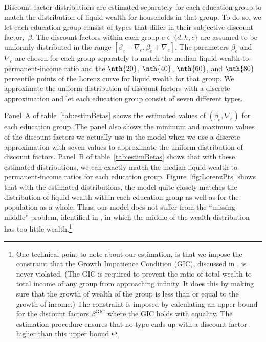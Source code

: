 \documentclass[\econtexRoot/HAFiscal]{subfiles}
\begin{document}
Discount factor distributions are estimated separately for each education group to match the distribution of liquid wealth for households in that group.
To do so, we let each education group consist of types that differ in their subjective discount factor,~$\beta$.
The discount factors within each group $e\in \{d, h, c\}$ are assumed to be uniformly distributed in the range $[\beta_e-\nabla_e, \beta_e+\nabla_e]$.
The parameters $\beta_e$ and $\nabla_e$ are chosen for each group separately to match the median liquid-wealth-to-permanent-income ratio and the $\nth{20}$, $\nth{40}$, $\nth{60}$, and $\nth{80}$ percentile points of the Lorenz curve for liquid wealth for that group.
We approximate the uniform distribution of discount factors with a discrete approximation and let each education group consist of seven different types.

Panel~A of table~\ref{tab:estimBetas} shows the estimated values of $(\beta_e, \nabla_e)$ for each education group.
The panel also shows the minimum and maximum values of the discount factors we actually use in the model when we use a discrete approximation with seven values to approximate the uniform distribution of discount factors.
Panel~B of table~\ref{tab:estimBetas} shows that with these estimated distributions, we can exactly match the median liquid-wealth-to-permanent-income ratios for each education group.
Figure~\ref{fig:LorenzPts} shows that with the estimated distributions, the model quite closely matches the distribution of liquid wealth within each education group as well as for the population as a whole.
Thus, our model does not suffer from the ``missing middle'' problem, identified in \cite{kaplanMPC2022}, in which the middle of the wealth distribution has too little wealth.\footnote{One technical point to note about our estimation, is that we impose the constraint that the Growth Impatience Condition (GIC), discussed in \cite{carroll2022theoretical}, is never violated. (The GIC is required to prevent the ratio of total wealth to total income of any group from approaching infinity. It does this by making sure that the growth of wealth of the group is less than or equal to the growth of income.) The constraint is imposed by calculating an upper bound for the discount factors $\beta^{\text{GIC}}$ where the GIC holds with equality. The estimation procedure ensures that no type ends up with a discount factor higher than this upper bound.} 
\end{document}
